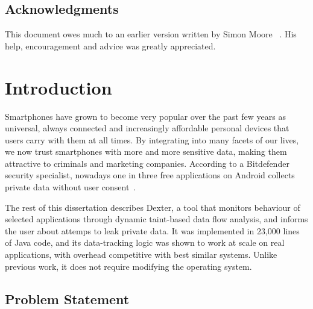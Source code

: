 \documentclass[12pt,twoside,notitlepage]{report}
\begin{document}
\bigskip
\medskip
{}

\cleardoublepage

\tableofcontents

\newpage
\section*{Acknowledgments}

This document owes much to an earlier version written by Simon Moore
~\cite{moore95}.  His help, encouragement and advice was greatly 
appreciated.


\cleardoublepage        %

\setcounter{page}{1}
\pagestyle{headings}

\chapter{Introduction}

Smartphones have grown to become very popular over the past few years as universal, always connected and increasingly affordable personal devices that users carry with them at all times. By integrating into many facets of our lives, we now trust smartphones with more and more sensitive data, making them attractive to criminals and marketing companies. According to a Bitdefender security specialist, nowadays one in three free applications on Android collects private data without user consent~\cite{web:HuffingtonOneInThree}. 

The rest of this dissertation describes Dexter, a tool that monitors behaviour of selected applications through dynamic taint-based data flow analysis, and informs the user about attemps to leak private data. It was implemented in 23,000 lines of Java code, and its data-tracking logic was shown to work at scale on real applications, with overhead competitive with best similar systems. Unlike previous work, it does not require modifying the operating system.

\section{Problem Statement}
\end{document}

